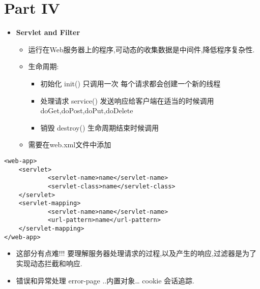 \documentclass[11pt]{article}
\begin{document}
\section{Part IV}
\label{sec:org2843da8}
\begin{itemize}
\item \textbf{Servlet and Filter}
\begin{itemize}
\item 运行在Web服务器上的程序,可动态的收集数据是中间件,降低程序复杂性.
\item 生命周期:
\begin{itemize}
\item 初始化     init()    只调用一次 每个请求都会创建一个新的线程
\item 处理请求   service() 发送响应给客户端在适当的时候调用doGet,doPost,doPut,doDelete
\item 销毁      destroy() 生命周期结束时候调用
\end{itemize}
\item 需要在web.xml文件中添加
\end{itemize}
\end{itemize}
\begin{verbatim}
<web-app>
    <servlet>
            <servlet-name>name</servlet-name>
            <servlet-class>name</servlet-class>
    </servlet>
    <servlet-mapping>
            <servlet-name>name</servlet-name>
            <url-pattern>name</url-pattern>
    </servlet-mapping>
</web-app>
\end{verbatim}
\begin{itemize}
\item 这部分有点难!!! 要理解服务器处理请求的过程,以及产生的响应,过滤器是为了实现动态拦截和响应.
\item 错误和异常处理 error-page ..内置对象\ldots{} cookie 会话追踪.
\end{itemize}
\end{document}
